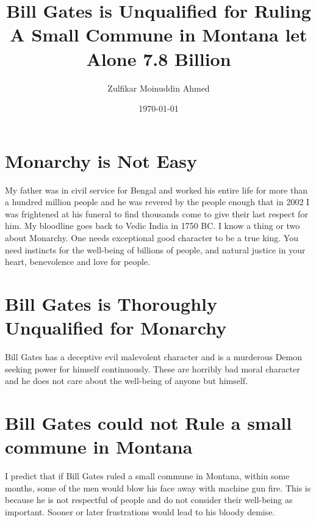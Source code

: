\documentclass{amsart}
\title{Bill Gates is Unqualified for Ruling A Small Commune in Montana let Alone 7.8 Billion}
\author{Zulfikar Moinuddin Ahmed}
\date{\today}
\begin{document}
\maketitle

\section{Monarchy is Not Easy}

My father was in civil service for Bengal and worked his entire life for more than a hundred million people and he was revered by the people enough that in 2002 I was frightened at his funeral to find thousands come to give their last respect for him.  My bloodline goes back to Vedic India in 1750 BC.  I know a thing or two about Monarchy.  One needs exceptional good character to be a true king.  You need instincts for the well-being of billions of people, and natural justice in your heart, benevolence and love for people.

\section{Bill Gates is Thoroughly Unqualified for Monarchy}

Bill Gates has a deceptive evil malevolent character and is a murderous Demon seeking power for himself continuously.  These are horribly bad moral character and he does not care about the well-being of anyone but himself.  

\section{Bill Gates could not Rule a small commune in Montana}

I predict that if Bill Gates ruled a small commune in Montana, within some months, some of the men would blow his face away with machine gun fire.  This is because he is not respectful of people and do not consider their well-being as important.  Sooner or later frustrations would lead to his bloody demise.
\end{document}
